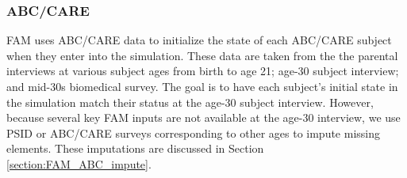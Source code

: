 \subsubsection{ABC/CARE}
\noindent FAM uses ABC/CARE data to initialize the state of each ABC/CARE subject when they enter into the simulation.  
These data are taken from the the parental interviews at various subject ages from birth to age 21; age-30 subject interview; and mid-30s biomedical survey.  
The goal is to have each subject's initial state in the simulation match their status at the age-30 subject interview. However, because several key FAM inputs are not available at the age-30 interview, we use PSID or ABC/CARE surveys corresponding to other ages to impute missing elements. These imputations are discussed in Section \ref{section:FAM_ABC_impute}. \\

